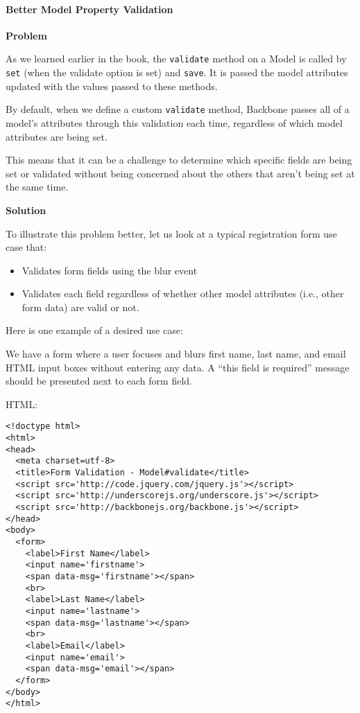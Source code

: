\documentclass[9pt]{book}
\begin{document}
\paragraph{Better Model Property
Validation}\label{better-model-property-validation}

\textbf{Problem}

As we learned earlier in the book, the \texttt{validate} method on a
Model is called by \texttt{set} (when the validate option is set) and
\texttt{save}. It is passed the model attributes updated with the values
passed to these methods.

By default, when we define a custom \texttt{validate} method, Backbone
passes all of a model's attributes through this validation each time,
regardless of which model attributes are being set.

This means that it can be a challenge to determine which specific fields
are being set or validated without being concerned about the others that
aren't being set at the same time.

\textbf{Solution}

To illustrate this problem better, let us look at a typical registration
form use case that:

\begin{itemize}
\itemsep1pt\parskip0pt
\item
  Validates form fields using the blur event
\item
  Validates each field regardless of whether other model attributes
  (i.e., other form data) are valid or not.
\end{itemize}

Here is one example of a desired use case:

We have a form where a user focuses and blurs first name, last name, and
email HTML input boxes without entering any data. A ``this field is
required'' message should be presented next to each form field.

HTML:

\begin{verbatim}
<!doctype html>
<html>
<head>
  <meta charset=utf-8>
  <title>Form Validation - Model#validate</title>
  <script src='http://code.jquery.com/jquery.js'></script>
  <script src='http://underscorejs.org/underscore.js'></script>
  <script src='http://backbonejs.org/backbone.js'></script>
</head>
<body>
  <form>
    <label>First Name</label>
    <input name='firstname'>
    <span data-msg='firstname'></span>
    <br>
    <label>Last Name</label>
    <input name='lastname'>
    <span data-msg='lastname'></span>
    <br>
    <label>Email</label>
    <input name='email'>
    <span data-msg='email'></span>
  </form>
</body>
</html>
\end{verbatim}
\end{document}
